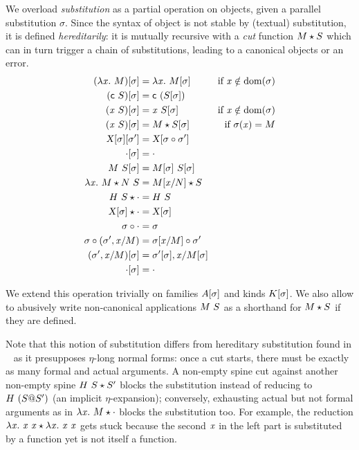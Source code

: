 \documentclass[9pt]{sigplanconf}
\begin{document}
We overload \emph{substitution} as a partial operation on objects, given
a parallel substitution $\sigma$. Since the syntax of object is not
stable by (textual) substitution, it is defined \emph{hereditarily}: it
is mutually recursive with a \emph{cut} function ${M}\star{S}$ which can
in turn trigger a chain of substitutions, leading to a canonical objects
or an error.
\begin{align*}
  {(\lambda{\ensuremath{\text{\textit{x}}}}.\ M)}[{\sigma}] &= \lambda{\ensuremath{\text{\textit{x}}}}.\  {{M}[{\sigma}]} &
  \text{if $\text{\textit{x}}\notin \operatorname{dom}{\!(\sigma)}$}
  \\
  {({\text{\textsf{c}}}\  S)}[{\sigma}] &= {\text{\textsf{c}}}\  {({S}[{\sigma}])}
  \\
  {({\text{\textit{x}}}\  S)}[{\sigma}] &=
  {\text{\textit{x}}}\  {{S}[{\sigma}]} &
  \text{if $\text{\textit{x}}\notin \operatorname{dom}{\!(\sigma)}$}
  \\
  {({\text{\textit{x}}}\  S)}[{\sigma}] &=
  {M}\star{{S}[{\sigma}]} &
  \text{if $\sigma(\text{\textit{x}}) = M$}
  \\
  {{\text{\textsl{X}}}[{\sigma}]}[{\sigma'}] &=
  {\text{\textsl{X}}}[{{\sigma}\circ{\sigma'}}]
  \\
  {\cdot}[{\sigma}] &=
  \cdot \\
  {{M}\ {S}}[{\sigma}] &=
  {{M}[{\sigma}]}\ {{S}[{\sigma}]}
  \\
  {\lambda{\ensuremath{\text{\textit{x}}}}.\  M}\star{{N}\ {S}} &=
  {{M}[{{\text{\textit{x}}}/{N}}]}\star{S}
  \\
  {{H}\  S}\star{\cdot} &=
  {H}\  S
  \\
  {{\text{\textsl{X}}}[{\sigma}]}\star{\cdot} &= {\text{\textsl{X}}}[{\sigma}]
  \\
  {\sigma}\circ{\cdot} &=
  \sigma
  \\
  {\sigma}\circ{({\sigma'},{{\ensuremath{\text{\textit{x}}}}/{M}})} &=
  {{\sigma}[{{\text{\textit{x}}}/{M}}]}\circ{\sigma}'
  \\
  {({\sigma'},{{\text{\textit{x}}}/{M}})}[{\sigma}] &=
  {{\sigma'}[{\sigma}]},{{\text{\textit{x}}}/{{M}[{\sigma}]}}
  \\
  {\cdot}[{\sigma}] &= \cdot
\end{align*}

We extend this operation trivially on families ${A}[{\sigma}]$ and
kinds ${K}[{\sigma}]$. We also allow to abusively write
non-canonical applications ${M}\  S$ as a shorthand for ${M}\star{S}$
if they are defined.

Note that this notion of substitution differs from hereditary
substitution found in \eg\ \cite{hl07mechanizing} as it presupposes
$\eta$-long normal forms: once a cut starts, there must be exactly as
many formal and actual arguments. A non-empty spine cut against
another non-empty spine ${{H}\  S}\star{S'}$ blocks the
substitution instead of reducing to ${H}\  {({S}@{S}')}$ (an
implicit $\eta$-expansion); conversely, exhausting actual but not
formal arguments as in ${\lambda{\ensuremath{\text{\textit{x}}}}.\  M}\star{\cdot}$ blocks the
substitution too. For example, the reduction ${\lambda{\ensuremath{\text{\textit{x}}}}.\  {\text{\textit{x}}}\ {\text{\textit{x}}}}\star{\lambda{\ensuremath{\text{\textit{x}}}}.\ {\ensuremath{\text{\textit{x}}}}\ {\ensuremath{\text{\textit{x}}}}}$ gets stuck because the
second $\text{\textit{x}}$ in the left part is substituted by a function yet is
not itself a function.
\end{document}
